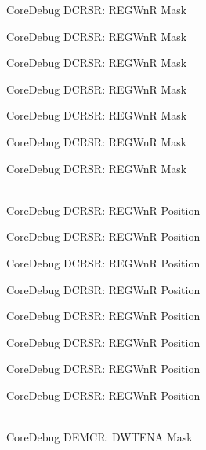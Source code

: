 \begin{DoxyRefList}
\label{deprecated__deprecated000130}%
%
Core\+Debug DCRSR:\+ REGWnR Mask 

\label{deprecated__deprecated000186}%
%
Core\+Debug DCRSR:\+ REGWnR Mask 

\label{deprecated__deprecated000269}%
%
Core\+Debug DCRSR:\+ REGWnR Mask 

\label{deprecated__deprecated000328}%
%
Core\+Debug DCRSR:\+ REGWnR Mask 

\label{deprecated__deprecated000404}%
%
Core\+Debug DCRSR:\+ REGWnR Mask 

\label{deprecated__deprecated000493}%
%
Core\+Debug DCRSR:\+ REGWnR Mask 

\label{deprecated__deprecated000595}%
%
Core\+Debug DCRSR:\+ REGWnR Mask  
\item[{\parbox[t]{\linewidth}{Global \doxylink{group__CMSIS__CoreDebug_ga51e75942fc0614bc9bb2c0e96fcdda9a}{Core\+Debug\+\_\+\+DCRSR\+\_\+\+REGWn\+R\+\_\+\+Pos} }}]\hfill \\
\label{deprecated__deprecated000041}%
%
Core\+Debug DCRSR:\+ REGWnR Position 

\label{deprecated__deprecated000129}%
%
Core\+Debug DCRSR:\+ REGWnR Position 

\label{deprecated__deprecated000185}%
%
Core\+Debug DCRSR:\+ REGWnR Position 

\label{deprecated__deprecated000268}%
%
Core\+Debug DCRSR:\+ REGWnR Position 

\label{deprecated__deprecated000327}%
%
Core\+Debug DCRSR:\+ REGWnR Position 

\label{deprecated__deprecated000403}%
%
Core\+Debug DCRSR:\+ REGWnR Position 

\label{deprecated__deprecated000492}%
%
Core\+Debug DCRSR:\+ REGWnR Position 

\label{deprecated__deprecated000594}%
%
Core\+Debug DCRSR:\+ REGWnR Position  
\item[{\parbox[t]{\linewidth}{Global \doxylink{group__CMSIS__CoreDebug_ga2fcc0b8f174e85379d38e1cb74b8c627}{Core\+Debug\+\_\+\+DEMCR\+\_\+\+DWTENA\+\_\+\+Msk} }}]\hfill \\
\label{deprecated__deprecated000134}%
%
Core\+Debug DEMCR:\+ DWTENA Mask 


\end{DoxyRefList}
